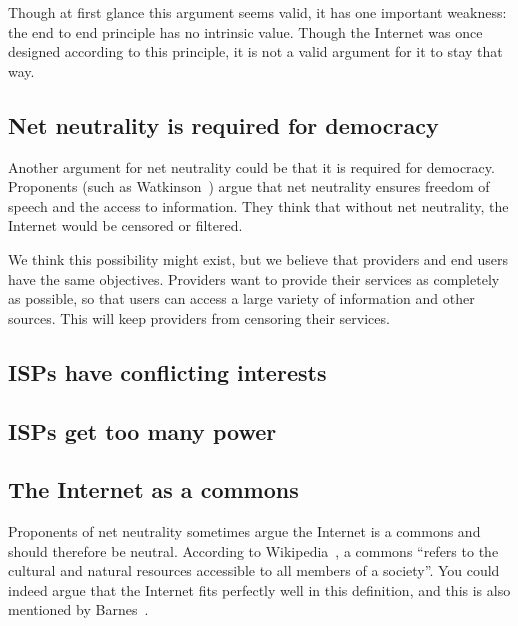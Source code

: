 Though at first glance this argument seems valid, it has one important weakness: the end to end principle has no intrinsic value. Though the Internet was once designed according to this principle, it is not a valid argument for it to stay that way.



\subsection{Net neutrality is required for democracy}
Another argument for net neutrality could be that it is required for democracy.
Proponents (such as Watkinson~\cite{watkinson2012democracy}) argue that net neutrality ensures freedom of speech and the access to information.
They think that without net neutrality, the Internet would be censored or filtered.

We think this possibility might exist, but we believe that providers and end users have the same objectives.
Providers want to provide their services as completely as possible, so that users can access a large variety of information and other sources.
This will keep providers from censoring their services.

\subsection{\acp{ISP} have conflicting interests}

\subsection{\acp{ISP} get too many power}

\subsection{The Internet as a commons}
Proponents of net neutrality sometimes argue the Internet is a commons and should therefore be neutral.
According to Wikipedia~\cite{wikipedia2014commons}, a commons ``refers to the cultural and natural resources accessible to all members of a society''.
You could indeed argue that the Internet fits perfectly well in this definition, and this is also mentioned by Barnes~\cite{barnes2003capitalism}.

